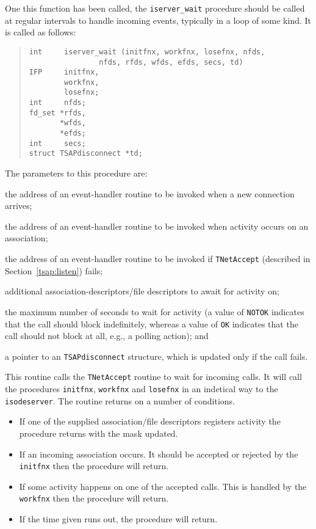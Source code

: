 One this function has been called, the \verb|iserver_wait| procedure
should be called at regular intervals to handle incoming events,
typically in a loop of some kind. It is called as follows:
\begin{quote}\small\begin{verbatim}
int     iserver_wait (initfnx, workfnx, losefnx, nfds, 
                nfds, rfds, wfds, efds, secs, td)
IFP     initfnx,
        workfnx,
        losefnx;
int     nfds;
fd_set *rfds,
       *wfds,
       *efds;
int     secs;
struct TSAPdisconnect *td;
\end{verbatim}\end{quote}
The parameters to this procedure are:
\begin{describe}

\item[\verb"initfnx":] the address of an event-handler routine to be invoked
when a new connection arrives;

\item[\verb"workfnx":] the address of an event-handler routine to be invoked
when activity occurs on an association;

\item[\verb"losefnx":] the address of an event-handler routine to be invoked
if \verb"TNetAccept" (described in Section~\ref{tsap:listen}) fails;

\item[\verb|nfds/rfds/wfds/efds|:]	additional
association-descriptors/file descriptors to await for activity on;

\item[\verb|secs|:]	the maximum number of seconds to wait for
activity (a value of \verb|NOTOK| indicates that the call should block
indefinitely, whereas a value of \verb|OK| indicates that the call
should not block at all, e.g., a polling action); and

\item[\verb"td":] a pointer to an \verb"TSAPdisconnect" structure,
which is updated only if the call fails.
\end{describe}

This routine calls the \verb|TNetAccept| routine to wait for incoming
calls. It will call the procedures \verb|initfnx|, \verb|workfnx| and
\verb|losefnx| in an indetical way to the \verb|isodeserver|. The
routine returns on a number of conditions.
\begin{itemize}
\item	If one of the supplied association/file descriptors registers
activity the procedure returns with the mask updated.

\item	If an incoming association occurs. It should be accepted or
rejected by the \verb|initfnx| then the procedure will return.

\item	If some activity happens on one of the accepted calls. This is
handled by the \verb|workfnx| then the procedure will return.

\item	If the time given runs out, the procedure will return.
\end{itemize}

